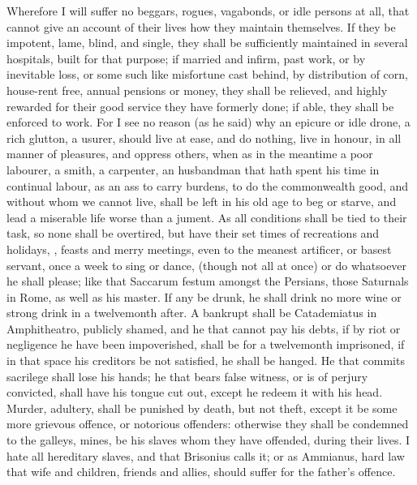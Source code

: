 Wherefore I will suffer no beggars, rogues, vagabonds, or idle
persons at all, that cannot give an account of their lives how they
maintain themselves. If they be impotent, lame, blind, and single,
they shall be sufficiently maintained in several hospitals, built for
that purpose; if married and infirm, past work, or by inevitable loss,
or some such like misfortune cast behind, by distribution of corn,
house-rent free, annual pensions or money, they shall be relieved, and
highly rewarded for their good service they have formerly done; if
able, they shall be enforced to work. For I see no reason (as
he said) why an epicure or idle drone, a rich glutton, a usurer,
should live at ease, and do nothing, live in honour, in all manner of
pleasures, and oppress others, when as in the meantime a poor labourer,
a smith, a carpenter, an husbandman that hath spent his time in
continual labour, as an ass to carry burdens, to do the commonwealth
good, and without whom we cannot live, shall be left in his old age to
beg or starve, and lead a miserable life worse than a jument. As
all conditions shall be tied to their task, so none shall be
overtired, but have their set times of recreations and holidays,
, feasts and merry meetings, even to the meanest
artificer, or basest servant, once a week to sing or dance, (though not
all at once) or do whatsoever he shall please; like that Saccarum
festum amongst the Persians, those Saturnals in Rome, as well as his
master. If any be drunk, he shall drink no more wine or strong
drink in a twelvemonth after. A bankrupt shall be  Catademiatus in
Amphitheatro, publicly shamed, and he that cannot pay his debts, if by
riot or negligence he have been impoverished, shall be for a
twelvemonth imprisoned, if in that space his creditors be not
satisfied, he shall be hanged. He that commits sacrilege
shall lose his hands; he that bears false witness, or is of perjury
convicted, shall have his tongue cut out, except he redeem it with his
head. Murder,  adultery, shall be punished by death, but not
theft, except it be some more grievous offence, or notorious offenders:
otherwise they shall be condemned to the galleys, mines, be his slaves
whom they have offended, during their lives. I hate all hereditary
slaves, and that  Brisonius calls it; or as
Ammianus,  hard law that wife and children,
friends and allies, should suffer for the father's offence.

